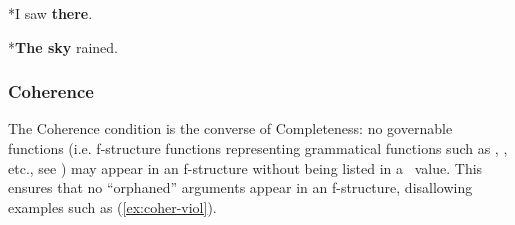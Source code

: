 \documentclass[output=paper,hidelinks]{langscibook}
\begin{document}
 \ea\label{ex:noexpl} *{I saw \textbf{there}.}\z
 
 \ea\label{ex:nosemrole} *{\textbf{The sky} rained.}\z
 
 \subsubsection{Coherence}\label{sec:CoreConcepts:Coherence}
 
 The Coherence condition is the converse of Completeness: no governable functions (i.e. f-structure functions representing grammatical functions such as \SUBJ, \OBJ, etc., see ) may appear in an f-structure without being listed in a \PRED\ value. This ensures that no ``orphaned'' arguments appear in an f-structure, disallowing examples such as (\ref{ex:coher-viol}).
\end{document}
